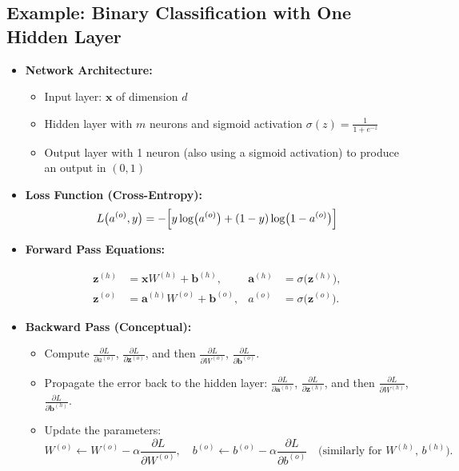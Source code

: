 \documentclass{article}
\begin{document}
\subsection{Example: Binary Classification with One Hidden Layer}

\begin{itemize}
    \item \textbf{Network Architecture:}
    \begin{itemize}
        \item Input layer: $\mathbf{x}$ of dimension $d$
        \item Hidden layer with $m$ neurons and sigmoid activation $\sigma(z) = \frac{1}{1+e^{-z}}$
        \item Output layer with 1 neuron (also using a sigmoid activation) to produce an output in $(0,1)$
    \end{itemize}
    \item \textbf{Loss Function (Cross-Entropy):}
    \[
    L\bigl(a^{(o)}, y\bigr)
    = -\Bigl[y\log\bigl(a^{(o)}\bigr) + (1-y)\log\bigl(1 - a^{(o)}\bigr)\Bigr]
    \]
    \item \textbf{Forward Pass Equations:}

    \[
    \begin{aligned}
    \mathbf{z}^{(h)} &= \mathbf{x}W^{(h)} + \mathbf{b}^{(h)}, 
    & \mathbf{a}^{(h)} &= \sigma\bigl(\mathbf{z}^{(h)}\bigr),
    \\
    \mathbf{z}^{(o)} &= \mathbf{a}^{(h)}W^{(o)} + \mathbf{b}^{(o)}, 
    & a^{(o)} &= \sigma\bigl(\mathbf{z}^{(o)}\bigr).
    \end{aligned}
    \]

    \item \textbf{Backward Pass (Conceptual):}
    \begin{itemize}
        \item Compute $\frac{\partial L}{\partial a^{(o)}}$, $\frac{\partial L}{\partial \mathbf{z}^{(o)}}$, and then $\frac{\partial L}{\partial W^{(o)}}$, $\frac{\partial L}{\partial \mathbf{b}^{(o)}}$.
        \item Propagate the error back to the hidden layer: $\frac{\partial L}{\partial \mathbf{a}^{(h)}}$, $\frac{\partial L}{\partial \mathbf{z}^{(h)}}$, and then $\frac{\partial L}{\partial W^{(h)}}$, $\frac{\partial L}{\partial \mathbf{b}^{(h)}}$.
        \item Update the parameters: 
        \[
        W^{(o)} \leftarrow W^{(o)} - \alpha \frac{\partial L}{\partial W^{(o)}},
        \quad
        b^{(o)} \leftarrow b^{(o)} - \alpha \frac{\partial L}{\partial b^{(o)}} \quad \text{(similarly for } W^{(h)}\text{, }b^{(h)}\text{).}
        \]
    \end{itemize}
\end{itemize}
\end{document}
